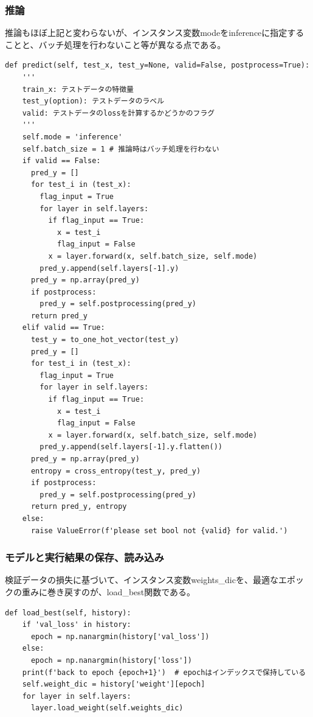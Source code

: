 \documentclass[platex,dvipdfmx]{jsarticle}
\begin{document}
\subsubsection{推論}

推論もほぼ上記と変わらないが、インスタンス変数modeをinferenceに指定することと、バッチ処理を行わないこと等が異なる点である。

\begin{lstlisting}[caption=ex\_advanced.py, label=predict]
  def predict(self, test_x, test_y=None, valid=False, postprocess=True):
    '''
    train_x: テストデータの特徴量
    test_y(option): テストデータのラベル
    valid: テストデータのlossを計算するかどうかのフラグ
    '''
    self.mode = 'inference'
    self.batch_size = 1 # 推論時はバッチ処理を行わない
    if valid == False:
      pred_y = []
      for test_i in (test_x):
        flag_input = True
        for layer in self.layers:
          if flag_input == True:
            x = test_i
            flag_input = False
          x = layer.forward(x, self.batch_size, self.mode)
        pred_y.append(self.layers[-1].y)
      pred_y = np.array(pred_y)
      if postprocess:
        pred_y = self.postprocessing(pred_y)
      return pred_y
    elif valid == True:
      test_y = to_one_hot_vector(test_y)
      pred_y = []
      for test_i in (test_x):
        flag_input = True
        for layer in self.layers:
          if flag_input == True:
            x = test_i
            flag_input = False
          x = layer.forward(x, self.batch_size, self.mode)
        pred_y.append(self.layers[-1].y.flatten())
      pred_y = np.array(pred_y)
      entropy = cross_entropy(test_y, pred_y)
      if postprocess:
        pred_y = self.postprocessing(pred_y)
      return pred_y, entropy
    else:
      raise ValueError(f'please set bool not {valid} for valid.')
  \end{lstlisting}


\subsubsection{モデルと実行結果の保存、読み込み}

検証データの損失に基づいて、インスタンス変数weights\_dicを、最適なエポックの重みに巻き戻すのが、load\_best関数である。

\begin{lstlisting}[caption=ex\_advanced.py, label=loadBest]
  def load_best(self, history):
    if 'val_loss' in history:
      epoch = np.nanargmin(history['val_loss'])
    else:
      epoch = np.nanargmin(history['loss'])
    print(f'back to epoch {epoch+1}')  # epochはインデックスで保持している
    self.weight_dic = history['weight'][epoch]
    for layer in self.layers:
      layer.load_weight(self.weights_dic)
\end{lstlisting}
\end{document}
